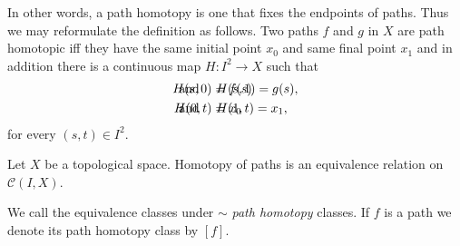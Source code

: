 In other words, a path homotopy is one that fixes the endpoints of  paths. Thus we may reformulate the definition as follows. Two paths \(f\) and \(g\) in \(X\) are path homotopic iff they have the same initial point \(x_0\) and same final point \(x_1\) and in addition there is a continuous map \(H\colon I^2 \to X\) such that \begin{align*}
    H(s,0) &= f(s)&& \hspace{-2.5cm}\text{ and }\quad H(s,1) = g(s),\\
    H(0,t) &= x_0 && \hspace{-2.5cm}\text{ and }\quad H(1,t) = x_1,
\end{align*}
for every \((s,t)\in I^2\). 

\begin{theorem}
    Let \(X\) be a topological space. Homotopy of paths is an equivalence relation on \(\mathcal{C}(I,X)\).
\end{theorem}

\begin{remark}
    We call the equivalence classes under \(\sim\) \textit{path homotopy} classes. If \(f\) is a path we  denote its path homotopy class by \([f]\).
\end{remark}


